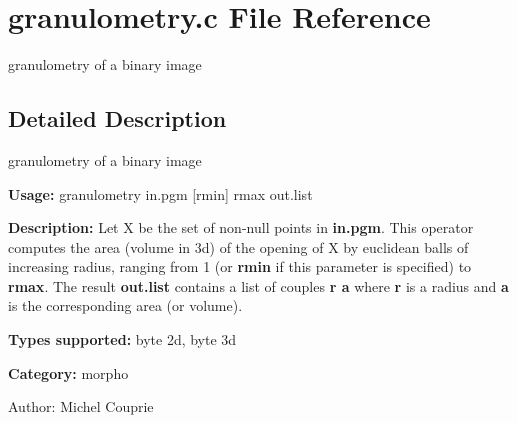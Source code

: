 \section{granulometry.c File Reference}
\label{granulometry_8c}
granulometry of a binary image  




\label{_details}
\subsection{Detailed Description}
granulometry of a binary image 

{\bf Usage:} granulometry in.pgm [rmin] rmax out.list

{\bf Description:} Let X be the set of non-null points in {\bf in.pgm}. This operator computes the area (volume in 3d) of the opening of X by euclidean balls of increasing radius, ranging from 1 (or {\bf rmin} if this parameter is specified) to {\bf rmax}. The result {\bf out.list} contains a list of couples {\bf r a} where {\bf r} is a radius and {\bf a} is the corresponding area (or volume).

{\bf Types supported:} byte 2d, byte 3d

{\bf Category:} morpho

\begin{Desc}
\item[Author:]Michel Couprie \end{Desc}
